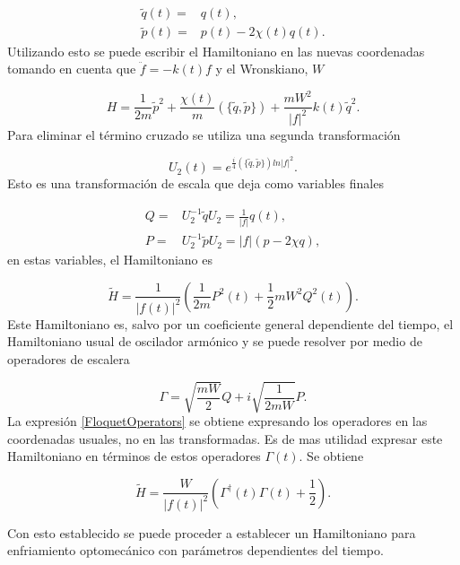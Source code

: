 \documentclass[10pt,a4paper]{report}
\begin{document}
\begin{align}
\tilde{q}(t)=&q(t),\\
\tilde{p}(t)=&p(t)-2\chi(t)q(t).
\end{align}Utilizando esto se puede escribir el Hamiltoniano en las nuevas coordenadas tomando en cuenta que $\ddot{f}= -k(t)f$ y el Wronskiano, $W$

\begin{equation}
 H = \frac{1}{2m}\tilde{p}^2 + \frac{\chi(t)}{m}(\{\tilde{q},\tilde{p}\}) + \frac{mW^2}{|f|^2}k(t)\tilde{q}^2.
\end{equation}Para eliminar el término cruzado se utiliza una segunda transformación

\begin{equation}
U_2(t)=e^{\frac{i}{4}(\{\tilde{q},\tilde{p}\})ln|f|^2}.
\end{equation}Esto es una transformación de escala que deja como variables finales

\begin{align}
Q=&U_2^{-1}\tilde{q}U_2 =\frac{1}{|f|}q(t),\\
P=&U_2^{-1}\tilde{p}U_2 = |f|(p-2\chi q), 
\end{align} en estas variables, el Hamiltoniano es

\begin{equation}\label{QTDHO}
\tilde{H} = \frac{1}{|f(t)|^2}(\frac{1}{2m}P^2(t)+\frac{1}{2}mW^2Q^2(t)).
\end{equation}Este Hamiltoniano es, salvo por un coeficiente general dependiente del tiempo, el Hamiltoniano usual de oscilador armónico y se puede resolver por medio de operadores de escalera

\begin{equation}
\Gamma = \sqrt{\frac{mW}{2}}Q + i \sqrt{\frac{1}{2mW}}P.
\end{equation} La expresión \eqref{FloquetOperators} se obtiene expresando los operadores en las coordenadas usuales, no en las transformadas. Es de mas utilidad expresar este Hamiltoniano en términos de estos operadores $\Gamma(t)$. Se obtiene

\begin{equation}
\tilde{H} = \frac{W}{|f(t)|^2}(\Gamma^\dagger(t)\Gamma(t) + \frac{1}{2}).
\end{equation}

Con esto establecido se puede proceder a establecer un Hamiltoniano para enfriamiento optomecánico con parámetros dependientes del tiempo.

\end{document}
